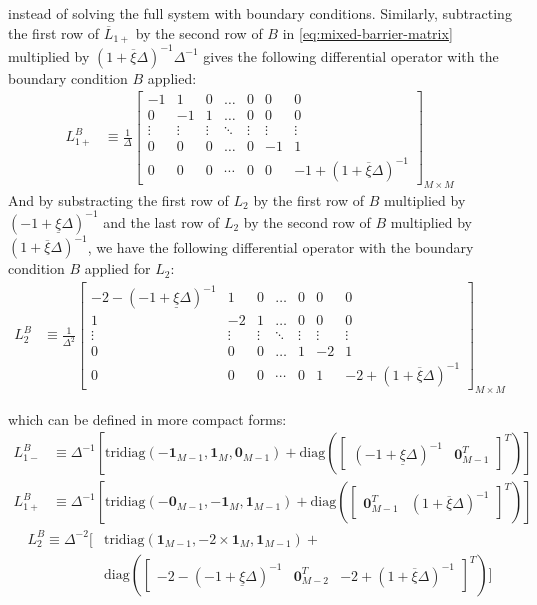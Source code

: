 \documentclass[11pt]{article}
\newcommand{\diag}{\ensuremath{\mathrm{diag}}}
\theoremstyle{definition}
\begin{document}
instead of solving the full system with boundary conditions. Similarly, subtracting the first row of $\overline{L}_{1+}$ by the second row of $B$ in \eqref{eq:mixed-barrier-matrix} multiplied by $(1 + \overline{\xi} \Delta )^{-1} \Delta^{-1}$ gives the following differential operator with the boundary condition $B$ applied:
\begin{align}
L_{1+}^B &\equiv \frac{1}{\Delta}\begin{bmatrix}
-1&1&0&\dots&0&0&0\\
0&-1&1&\dots&0&0&0\\
\vdots&\vdots&\vdots&\ddots&\vdots&\vdots&\vdots\\
0&0&0&\dots&0&-1&1\\
0&0&0&\cdots&0&0&-1+(1+\overline{\xi} \Delta)^{-1}
\end{bmatrix}_{M\times M}\label{eq:L-1-plus-regular}
\end{align}
And by substracting the first row of $L_2$ by the first row of $B$ multiplied by $(-1 + \underline{\xi} \Delta )^{-1}$ and the last row of $L_2$ by the second row of $B$ multiplied by $(1 + \overline{\xi} \Delta)^{-1}$, we have the following differential operator with the boundary condition $B$ applied for $L_2$:
\begin{align}
L_2^B &\equiv \frac{1}{\Delta^2}\begin{bmatrix}
-2 - (-1 + \underline{\xi}\Delta)^{-1} &1&0&\dots&0&0&0\\
1&-2&1&\dots&0&0&0\\
\vdots&\vdots&\vdots&\ddots&\vdots&\vdots&\vdots\\
0&0&0&\dots&1&-2&1\\
0&0&0&\cdots&0&1&-2 + (1+ \overline{\xi}\Delta)^{-1}
\end{bmatrix}_{M\times M}\label{eq:L-2-regular}
\end{align}

which can be defined in more compact forms:
\begin{align}
L_{1-}^B &\equiv \Delta^{-1}
\left[ 
\text{tridiag}(-\mathbf{1}_{M-1}, 
\mathbf{1}_{M}, \mathbf{0}_{M-1} ) + \diag \left( \begin{bmatrix}
(-1+\underline{\xi} \Delta)^{-1} &
\mathbf{0}_{M-1}^T 
\end{bmatrix}^T
\right)
\right]
\end{align}
\begin{align}
L_{1+}^B &\equiv 
\Delta^{-1}
\left[ 
\text{tridiag}(-\mathbf{0}_{M-1}, 
\mathbf{-1}_{M}, \mathbf{1}_{M-1} ) + \diag \left( \begin{bmatrix}
\mathbf{0}_{M-1}^T &
(1+\overline{\xi} \Delta)^{-1}
\end{bmatrix}^T
\right)
\right]
\end{align}
\begin{align}
L_2^B \equiv  \Delta^{-2} 
\Big[ 
&\text{tridiag}(
\mathbf{1}_{M-1},
-2 \times \mathbf{1}_M,
\mathbf{1}_{M-1} )
+ \\
&\diag \left( \begin{bmatrix}
-2-(-1+\underline{\xi} \Delta)^{-1}&
\mathbf{0}_{M-2}^T &
-2+(1+\overline{\xi} \Delta)^{-1}
\end{bmatrix}^T \right)
\Big]
\end{align}
\end{document}
